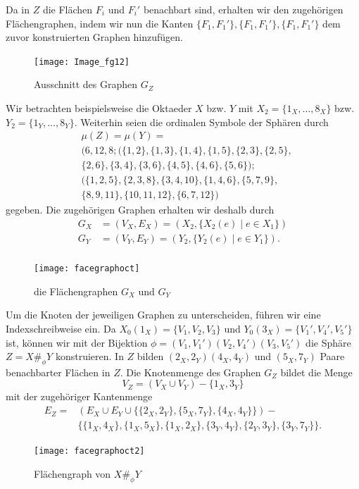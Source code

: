 \documentclass[12pt,titlepage,twoside,cleardoublepage]{article}
\theoremstyle{nummermitklammern}
\numberwithin{equation}{section}
\begin{document}
Da in $Z$ die Flächen $F_i$ und $F_i'$ benachbart sind, erhalten wir den zugehörigen Flächengraphen, indem wir nun die Kanten $\{F_1,F_1'\},\{F_1,F_1'\},\{F_1,F_1'\}$ dem zuvor konstruierten Graphen hinzufügen. 
\begin{figure}[H]
\begin{center}
\texttt{[image: Image\_fg12]}
\end{center}
\caption{Ausschnitt des Graphen $G_Z$}
\end{figure}
Wir betrachten beispielsweise die Oktaeder $X$ bzw. $Y$ mit $X_2=\{1_X,\ldots,8_X\}$ bzw. $Y_2=\{1_Y,\ldots,8_Y\}.$
Weiterhin seien die ordinalen Symbole der Sphären durch
\begin{align*}
&\mu(Z)= \mu(Y)=\\
 &(6,12,8;(\{1,2\},\{1,3\},\{1,4\},\{1,5\},\{2,3\},\{2,5\},\\
 &\{2,6\},\{3,4\},\{3,6\},\{4,5\},\{4,6\},\{5,6\});\\
 &(\{1,2,5\},\{2,3,8\},\{3,4,10\},\{1,4,6\},\{5,7,9\},\\&\{8,9,11\},\{10,11,12\},\{6,7,12\})
 \end{align*}
 gegeben. Die zugehörigen Graphen erhalten wir deshalb durch 
\begin{align*}
G_X&=(V_X,E_X)=(X_2,\{X_2(e)\mid e\in X_1\})\\G_Y&=(V_Y,E_Y)=(Y_2,\{Y_2(e)\mid e\in Y_1\}).\\
\end{align*}
 \begin{figure}[H]
\begin{center}
\texttt{[image: facegraphoct]}
\end{center}
\caption{die Flächengraphen $G_X$ und $G_Y$}
\end{figure}   
Um die Knoten der jeweiligen Graphen zu unterscheiden, führen wir eine Indexschreibweise ein.
Da $X_0(1_X)=\{V_1,V_2,V_3\}$ und $Y_0(3_X)=\{V_1',V_4',V_5'\}$ ist, können wir mit der Bijektion $\phi=(V_1,V_1')(V_2,V_4')(V_3,V_5')$ die Sphäre $Z=X\#_\phi Y$ konstruieren. In $Z$ bilden $(2_X,2_Y)(4_X,4_Y)$ und $(5_X,7_Y)$ Paare benachbarter Flächen in $Z.$
Die Knotenmenge des Graphen $G_Z$ bildet die Menge 
\[
V_Z=(V_X \cup V_Y)-\{1_X,3_Y\}
\]
mit der zugehöriger Kantenmenge 
\begin{align*}
E_Z=&(E_X \cup E_Y\cup \{\{2_X,2_Y\},\{5_X,7_Y\},\{4_X,4_Y\}\})-\\
&\{\{1_X,4_X\},\{1_X,5_X\},\{1_X,2_X\},\{3_Y,4_Y\},\{2_Y,3_Y\},\{3_Y,7_Y\}\}.
\end{align*}
\begin{figure}[H]
\begin{center}
\texttt{[image: facegraphoct2]}
\end{center}
\caption{Flächengraph von $X\#_{\phi} Y$}
\end{figure}   
\end{document}
